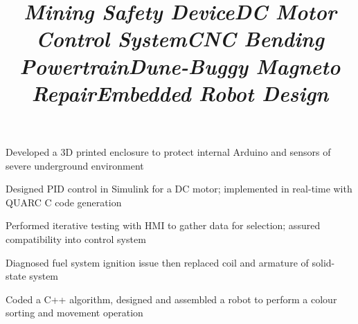 \documentclass[mm]{res}
\newcommand{\tb}{\textbullet \xspace}
\begin{document}
\begin{resume}
\title{\textsl{Mining Safety Device}}
\begin{position}
\tb Developed a 3D printed enclosure to protect internal Arduino and sensors of severe underground environment
\end{position}

\title{\textsl{DC Motor Control System}}
\begin{position}
\tb Designed PID control in Simulink for a DC motor; implemented in real-time with QUARC C code generation
\end{position}

\title{\textsl{CNC Bending Powertrain}}
\begin{position}
\tb Performed iterative testing with HMI to gather data for selection; assured compatibility into control system
\end{position}

\title{\textsl{Dune-Buggy Magneto Repair}}
\begin{position}
\tb Diagnosed fuel system ignition issue then replaced coil and armature of solid-state system
\end{position}

%

\title{\textsl{Embedded Robot Design}}
\begin{position}
\tb Coded a C++ algorithm, designed and assembled a robot to perform a colour sorting and movement operation
\end{position}


\end{resume}
\end{document}
